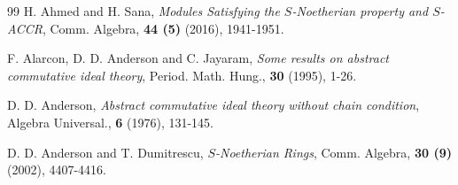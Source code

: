 \documentclass[10pt,twoside,a4]{amsart}
\numberwithin{equation}{section}
\theoremstyle{plain}
\theoremstyle{definition}
\begin{document}
	\nocite{*}
\begin{thebibliography}{99}
 H. Ahmed and H. Sana, {\it Modules Satisfying the $S$-Noetherian property and $S$-ACCR}, Comm.  Algebra, {\bf 44 (5)} (2016), 1941-1951.
		
		 F. Alarcon, D. D. Anderson and C. Jayaram, {\it Some results on abstract commutative ideal theory}, Period. Math. Hung., {\bf 30} (1995), 1-26. 
		
		
		 D. D. Anderson, {\it Abstract commutative ideal theory without chain condition}, Algebra Universal., {\bf 6} (1976), 131-145. 
		
		 D. D. Anderson and T. Dumitrescu, {\it $S$-Noetherian Rings}, Comm. Algebra, {\bf 30 (9)} (2002), 4407-4416.
		
		
		
		
		
		
		
		
		
		
		
		
		

\end{thebibliography}
\end{document}
